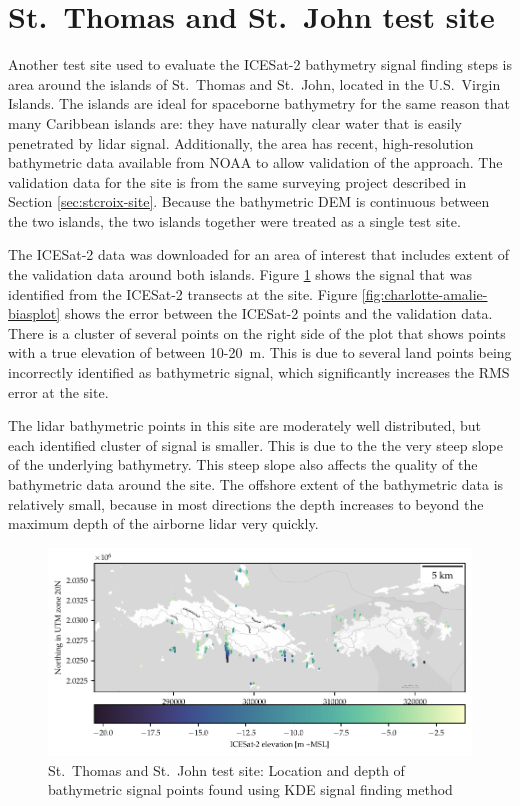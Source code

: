 \section{St.~Thomas and St.~John test site}
Another test site used to evaluate the ICESat-2 bathymetry signal finding steps is area around the islands of St.~Thomas and St.~John, located in the U.S.~Virgin Islands. The islands are ideal for spaceborne bathymetry for the same reason that many Caribbean islands are: they have naturally clear water that is easily penetrated by lidar signal. Additionally, the area has recent, high-resolution bathymetric data available from NOAA to allow validation of the approach. The validation data for the site is from the same surveying project described in Section \ref{sec:stcroix-site}. Because the bathymetric DEM is continuous between the two islands, the two islands together were treated as a single test site.

The ICESat-2 data was downloaded for an area of interest that includes extent of the validation data around both islands. Figure \ref{fig:charlotte-amalie-photons} shows the signal that was identified from the ICESat-2 transects at the site. Figure \ref{fig:charlotte-amalie-biasplot} shows the error between the ICESat-2 points and the validation data. There is a cluster of several points on the right side of the plot that shows points with a true elevation of between 10-20~m. This is due to several land points being incorrectly identified as bathymetric signal, which significantly increases the RMS error at the site.

The lidar bathymetric points in this site are moderately well distributed, but each identified cluster of signal is smaller. This is due to the the very steep slope of the underlying bathymetry. This steep slope also affects the quality of the bathymetric data around the site. The offshore extent of the bathymetric data is relatively small, because in most directions the depth increases to beyond the maximum depth of the airborne lidar very quickly.

\begin{figure}[htbp]
    \centering
    \includegraphics{figures/charlotteamalie_photon_map.pdf}
    \caption{St.~Thomas and St.~John test site: Location and depth of bathymetric signal points found using KDE signal finding method}
    \label{fig:charlotte-amalie-photons}
\end{figure}

